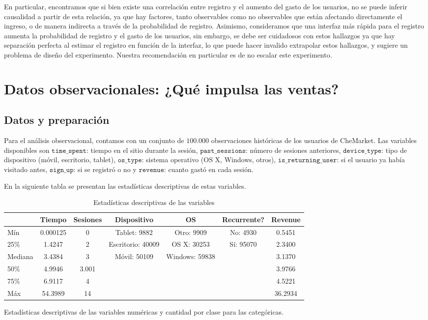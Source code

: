 \documentclass[conference]{IEEEtran}
\begin{document}
En particular, encontramos que si bien existe una correlación entre registro y el aumento del gasto de los usuarios, no se puede inferir causalidad a partir de esta relación, ya que hay factores, tanto observables como no observables que están afectando directamente el ingreso, o de manera indirecta a través de la probabilidad de registro. Asimismo, consideramos que una interfaz más rápida para el registro aumenta la probabilidad de registro y el gasto de los usuarios, sin embargo, se debe ser cuidadosos con estos hallazgos ya que hay separación perfecta al estimar el registro en función de la interfaz,
 lo que puede hacer invalido extrapolar estos hallazgos, y sugiere un problema de diseño del experimento. Nuestra recomendación en particular es de no escalar este experimento.

\section{Datos observacionales: ¿Qué impulsa las ventas?}

\subsection{Datos y preparación}

Para el análisis observacional, contamos con un conjunto de $100.000$ observaciones históricas de los usuarios de CheMarket. Las variables disponibles son $\texttt{time\_spent}$: tiempo en el sitio durante la sesión, $\texttt{past\_sessions}$: número de sesiones anteriores, 
$\texttt{device\_type}$: tipo de dispositivo (móvil, escritorio, tablet), $\texttt{os\_type}$: sistema operativo (OS X, Windows, otros), $\texttt{is\_returning\_user}$: si el usuario ya había visitado antes, $\texttt{sign\_up}$: si se registró o no y $\texttt{revenue}$: cuanto gastó en cada sesión.

En la siguiente tabla se presentan las estadísticas descriptivas de estas variables.


\begin{table}[H]
\ssmall
\centering
\caption{Estadísticas descriptivas de las variables}
\begin{tabular}{|l|c|c|c|c|c|c|}
\hline
 & \textbf{Tiempo} & \textbf{Sesiones} & \textbf{Dispositivo} & \textbf{OS} & \textbf{Recurrente?} & \textbf{Revenue} \\
\hline
Mín & 0.000125 & 0 & Tablet: 9882 & Otro: 9909 & No: 4930 & 0.5451 \\
25\% & 1.4247 & 2 & Escritorio: 40009 & OS X: 30253 & Sí: 95070 & 2.3400 \\
Mediana & 3.4384 & 3 & Móvil: 50109 & Windows: 59838 & & 3.1370 \\
50\% & 4.9946 & 3.001 & & & & 3.9766 \\
75\%  & 6.9117 & 4  & & & & 4.5221 \\
Máx & 54.3989 & 14  & & & & 36.2934 \\
\hline
\end{tabular}

\hfill \break
Estadísticas descriptivas de las variables numéricas y cantidad por clase para las categóricas.

\end{table}
\end{document}
